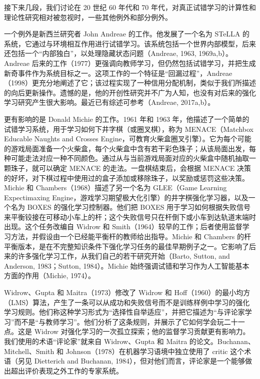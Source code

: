 \documentclass[UTF8,12pt,a4paper,fontset=fandol]{ctexart}
\begin{document}
接下来几段，我们讨论在 20 世纪 60 年代和 70 年代，对真正试错学习的计算性和理论性研究相对被忽视时，一些其他例外和部分例外。

一个例外是新西兰研究者 John Andreae 的工作。他发展了一个名为 STeLLA 的系统，它通过与环境相互作用进行试错学习。该系统包括一个世界内部模型，后来还包括一个“内部独白”，以处理隐藏状态问题（Andreae, 1963, 1969a,b）。Andreae 后来的工作（1977）更强调向教师学习，但仍然包括试错学习，并把生成新奇事件作为系统目标之一。这项工作的一个特征是“回漏过程”，Andreae（1998）更充分地阐述了它；该过程实现了一种信用分配机制，类似于我们所描述的向后更新操作。遗憾的是，他的开创性研究并不广为人知，也没有对后来的强化学习研究产生很大影响。最近已有综述可参考（Andreae, 2017a,b）。

更有影响的是 Donald Michie 的工作。1961 年和 1963 年，他描述了一个简单的试错学习系统，用于学习如何下井字棋（或圈叉棋），称为 MENACE（Matchbox Educable Naughts and Crosses Engine，可教育火柴盒圈叉引擎）。它为每个可能的游戏局面准备一个火柴盒，每个火柴盒中含有若干彩色珠子；从该局面出发，每种可能走法对应一种不同颜色。通过从与当前游戏局面对应的火柴盒中随机抽取一颗珠子，就可以确定 MENACE 的走法。一盘棋结束后，会根据 MENACE 决策的好坏，对下棋过程中使用过的盒子添加或移除珠子，以奖励或惩罚这些决策。Michie 和 Chambers（1968）描述了另一个名为 GLEE（Game Learning Expectimaxing Engine，游戏学习期望极大化引擎）的井字棋强化学习器，以及一个名为 BOXES 的强化学习控制器。他们把 BOXES 用于学习如何根据失败信号来平衡铰接在可移动小车上的杆；这个失败信号只在杆倒下或小车到达轨道末端时出现。这个任务改编自 Widrow 和 Smith（1964）较早的工作；后者使用监督学习方法，并假设由一个已经能平衡杆的教师给出指导。Michie 和 Chambers 的杆平衡版本，是在不完整知识条件下强化学习任务的最佳早期例子之一。它影响了后来的许多强化学习工作，从我们自己的若干研究开始（Barto, Sutton, and Anderson, 1983；Sutton, 1984）。Michie 始终强调试错和学习作为人工智能基本方面的作用（Michie, 1974）。

Widrow、Gupta 和 Maitra（1973）修改了 Widrow 和 Hoff（1960）的最小均方（LMS）算法，产生了一条可以从成功和失败信号而不是训练样例中学习的强化学习规则。他们称这种学习形式为“选择性自举适应”，并把它描述为“与评论家学习”而不是“与教师学习”。他们分析了这条规则，并展示了它如何学会玩二十一点。这是 Widrow 对强化学习的一次孤立探索；他的监督学习贡献更有影响力。我们使用的术语“评论家”就来自 Widrow、Gupta 和 Maitra 的论文。Buchanan、Mitchell、Smith 和 Johnson（1978）在机器学习语境中独立使用了 critic 这个术语（另见 Dietterich and Buchanan, 1984），但对他们而言，评论家是一个能够做出超出评价表现之外工作的专家系统。
\end{document}
